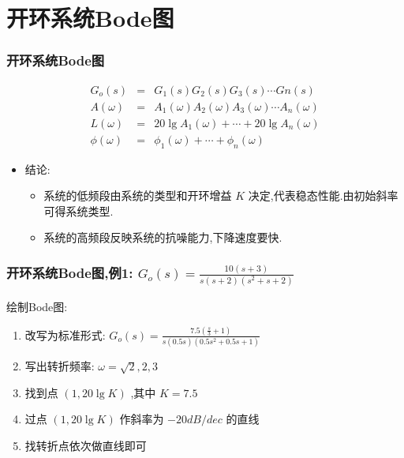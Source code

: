 \documentclass[table]{beamer}
\begin{document}
\section{开环系统Bode图}
\label{sec-2}
\begin{frame}
\frametitle{开环系统Bode图}
\label{sec-2-1}

\begin{eqnarray*}
G_o(s) &=  &G_1(s)G_2(s)G_3(s)\cdots Gn(s) \\
A(\omega) &=&A_1(\omega)A_2(\omega)A_3(\omega)\cdots A_n(\omega)\\
L(\omega) &=&20\lg A_1(\omega)+\cdots+20\lg A_n(\omega) \\
\phi(\omega) &=& \phi_1(\omega)+\cdots+\phi_n(\omega)
\end{eqnarray*}

\begin{itemize}
\item <2->结论:
\begin{itemize}
\item <2->系统的低频段由系统的类型和开环增益  $K$  决定,代表稳态性能.由初始斜率可得系统类型.
\item <3->系统的高频段反映系统的抗噪能力,下降速度要快.
\end{itemize}
\end{itemize}
\end{frame}
\begin{frame}
\frametitle{开环系统Bode图,例1: $G_o(s)=\frac{10(s+3)}{s(s+2)(s^2+s+2)}$}
\label{sec-2-2}

  绘制Bode图:
\begin{enumerate}
\item <2->改写为标准形式:  $G_o(s)=\frac{7.5(\frac{s}{3}+1)}{s(0.5s)(0.5s^2+0.5s+1)}$
\item <3->写出转折频率:  $\omega=\sqrt{2},2,3$
\item <4->找到点  $(1,20\lg K)$  ,其中 $K=7.5$
\item <5->过点  $(1,20\lg K)$  作斜率为  $-20dB/dec$  的直线
\item <6->找转折点依次做直线即可
\end{enumerate}
\end{frame}
\end{document}
